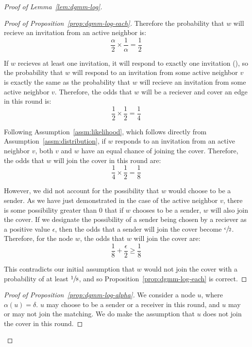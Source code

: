\begin{proof}[Proof of Lemma~\ref{lem:dgmm-log}]
\begin{proof}[Proof of Proposition~\ref{prop:dgmm-log-each}]
Therefore the probability that $w$ will recieve an invitation from an active neighbor is: \begin{equation*}\frac{\alpha}{2} \times \frac{1}{\alpha} = \frac{1}{2}\end{equation*}

If $w$ recieves at least one invitation, it will respond to exactly one invitation (), so the probability that $w$ will respond to an invitation from some active neighbor $v$ is exactly the same as the probability that $w$ will recieve an invitation from some active neighbor $v$. Therefore, the odds that $w$ will be a reciever and cover an edge in this round is: \begin{equation*}\frac{1}{2} \times \frac{1}{2} = \frac{1}{4}\end{equation*}

Following Assumption~\ref{assm:likelihood}, which follows directly from Assumption~\ref{assm:distribution}, if $w$ responds to an invitation from an active neighbor $v$, both $v$ and $w$ have an equal chance of joining the cover. Therefore, the odds that $w$ will join the cover in this round are:\begin{equation*}\frac{1}{4} \times \frac{1}{2} = \frac{1}{8}\end{equation*}

However, we did not account for the possibility that $w$ would choose to be a sender. As we have just demonstrated in the case of the active neighbor $v$, there is some possibility greater than 0 that if $w$ chooses to be a sender, $w$ will also join the cover. If we designate the possibility of a sender being chosen by a reciever as a positive value $\epsilon$, then the odds that a sender will join the cover become $\sfrac{\epsilon}{2}$. Therefore, for the node $w$, the odds that $w$ will join the cover are:\begin{equation*}\frac{1}{8} + \frac{\epsilon}{2} \ge \frac{1}{8}\end{equation*}

This contradicts our initial assumption that $w$ would not join the cover with a probability of at least $\sfrac{1}{8}$, and so Proposition~\ref{prop:dgmm-log-each} is correct.
\end{proof}
\begin{proof}[Proof of Proposition~\ref{prop:dgmm-log-alpha}]
We consider a node $u$, where $\alpha(u) = \delta$. $u$ may choose to be a sender or a receiver in this round, and $u$ may or may not join the matching. We do make the assumption that $u$ does not join the cover in this round.


\end{proof}
\end{proof}
